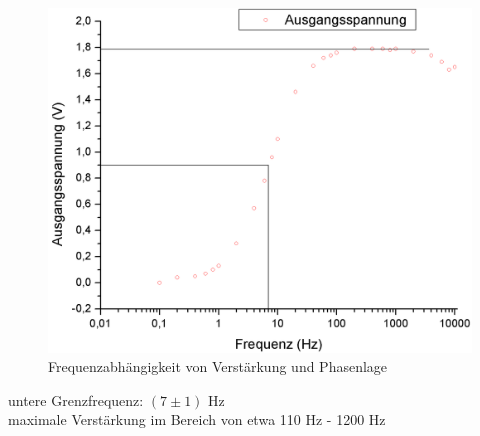 \documentclass[12pt,a4paper]{article}
\begin{document}
\begin{figure}[H]
	\centering
	\includegraphics[scale=0.45]{./data/frequenzabhaengigkeit.png}
	\caption{Frequenzabhängigkeit von Verstärkung und Phasenlage}
	\label{fig:frequenzabh}
\end{figure}

\noindent untere Grenzfrequenz: $(7 \pm 1)$ Hz\\
maximale Verstärkung im Bereich von etwa 110 Hz - 1200 Hz
\end{document}
